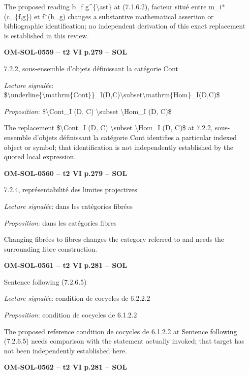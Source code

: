 The proposed reading b\_f g\textasciicircum{}\{\textbackslash{}ast\} at (7.1.6.2), facteur situé entre m\_i*(c\_\{f,g\}) et f*(b\_g) changes a substantive mathematical assertion or bibliographic identification; no independent derivation of this exact replacement is established in this review.\par
\par\noindent\textbf{OM-SOL-0559 -- t2 VI p.279 -- SOL}\par
7.2.2, sous-ensemble d'objets définissant la catégorie Cont\par
\emph{Lecture signalée}: \$\textbackslash{}underline\{\textbackslash{}mathrm\{Cont\}\}\_I(D,C)\textbackslash{}subset\textbackslash{}mathrm\{Hom\}\_I(D,C)\$\par
\emph{Proposition}: \$\textbackslash{}Cont\_I (D, C) \textbackslash{}subset \textbackslash{}Hom\_I (D, C)\$\par
The replacement \$\textbackslash{}Cont\_I (D, C) \textbackslash{}subset \textbackslash{}Hom\_I (D, C)\$ at 7.2.2, sous-ensemble d'objets définissant la catégorie Cont identifies a particular indexed object or symbol; that identification is not independently established by the quoted local expression.\par
\par\noindent\textbf{OM-SOL-0560 -- t2 VI p.279 -- SOL}\par
7.2.4, représentabilité des limites projectives\par
\emph{Lecture signalée}: dans les catégories fibrées\par
\emph{Proposition}: dans les catégories fibres\par
Changing fibrées to fibres changes the category referred to and needs the surrounding fibre construction.\par
\par\noindent\textbf{OM-SOL-0561 -- t2 VI p.281 -- SOL}\par
Sentence following (7.2.6.5)\par
\emph{Lecture signalée}: condition de cocycles de 6.2.2.2\par
\emph{Proposition}: condition de cocycles de 6.1.2.2\par
The proposed reference condition de cocycles de 6.1.2.2 at Sentence following (7.2.6.5) needs comparison with the statement actually invoked; that target has not been independently established here.\par
\par\noindent\textbf{OM-SOL-0562 -- t2 VI p.281 -- SOL}\par

